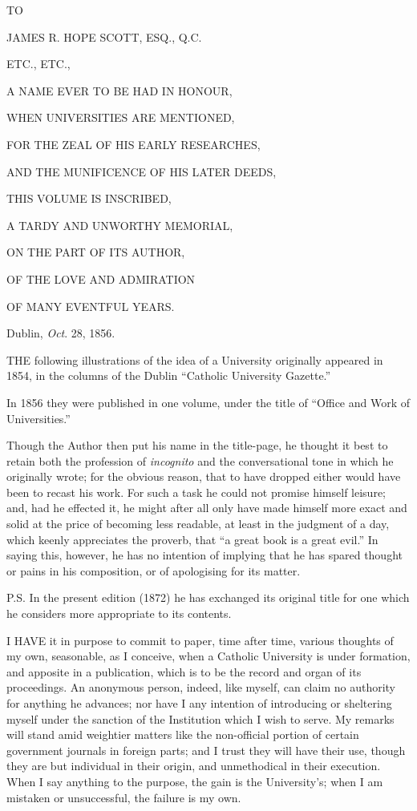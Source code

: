 



TO


JAMES R. HOPE SCOTT, ESQ., Q.C.


ETC., ETC.,


A NAME EVER TO BE HAD IN HONOUR,


WHEN UNIVERSITIES ARE MENTIONED,


FOR THE ZEAL OF HIS EARLY RESEARCHES,


AND THE MUNIFICENCE OF HIS LATER DEEDS,


THIS VOLUME IS INSCRIBED,


A TARDY AND UNWORTHY MEMORIAL,


ON THE PART OF ITS AUTHOR,


OF THE LOVE AND ADMIRATION


OF MANY EVENTFUL YEARS.





Dublin, \emph{Oct}. 28, 1856.


THE following illustrations of the idea of a
University originally appeared in 1854, in the columns of the Dublin
``Catholic University Gazette.''

In 1856 they were published in one volume, under the title of
``Office and Work of Universities.''

Though the Author then put his name in the title-page, he thought
it best to retain both the profession of \emph{incognito} and the
conversational tone in which he originally wrote; for the obvious
reason, that to have dropped either would have been to recast his
work. For such a task he could not promise himself leisure; and, had
he effected it, he might after all only have made himself more exact
and solid at the price of becoming less readable, at least in the
judgment of a day, which keenly appreciates the proverb, that ``a
great book is a great evil.'' In saying this, however, he has no
intention of implying that he has spared thought or pains in his
composition, or of apologising for its matter.

P.S. In the present edition (1872) he has exchanged its original
title for one which he considers more appropriate to its contents.


I HAVE it in purpose to commit to paper,
time after time, various thoughts of my own, seasonable, as I
conceive, when a Catholic University is under formation, and apposite
in a publication, which is to be the record and organ of its
proceedings. An anonymous person, indeed, like myself, can claim no
authority for anything he advances; nor have I any intention of
introducing or sheltering myself under the sanction of the Institution
which I wish to serve. My remarks will stand amid weightier matters
like the non-official portion of certain government journals in
foreign parts; and I trust they will have their use, though they are
but individual in their origin, and unmethodical in their execution.
When I say anything to the purpose, the gain is the University's;
when I am mistaken or unsuccessful, the failure is my own.

